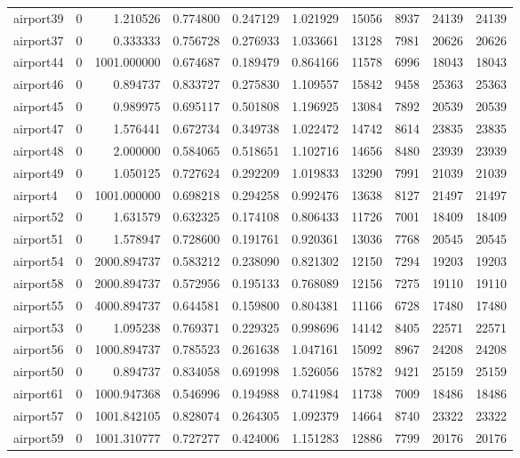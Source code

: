 \begin{longtable}{|l|r|r|r|r|r|r|r|r|r|}
airport39 & 0 & 1.210526 & 0.774800 & 0.247129 & 1.021929 & 15056 & 8937 & 24139 & 24139 \\
airport37 & 0 & 0.333333 & 0.756728 & 0.276933 & 1.033661 & 13128 & 7981 & 20626 & 20626 \\
airport44 & 0 & 1001.000000 & 0.674687 & 0.189479 & 0.864166 & 11578 & 6996 & 18043 & 18043 \\
airport46 & 0 & 0.894737 & 0.833727 & 0.275830 & 1.109557 & 15842 & 9458 & 25363 & 25363 \\
airport45 & 0 & 0.989975 & 0.695117 & 0.501808 & 1.196925 & 13084 & 7892 & 20539 & 20539 \\
airport47 & 0 & 1.576441 & 0.672734 & 0.349738 & 1.022472 & 14742 & 8614 & 23835 & 23835 \\
airport48 & 0 & 2.000000 & 0.584065 & 0.518651 & 1.102716 & 14656 & 8480 & 23939 & 23939 \\
airport49 & 0 & 1.050125 & 0.727624 & 0.292209 & 1.019833 & 13290 & 7991 & 21039 & 21039 \\
airport4 & 0 & 1001.000000 & 0.698218 & 0.294258 & 0.992476 & 13638 & 8127 & 21497 & 21497 \\
airport52 & 0 & 1.631579 & 0.632325 & 0.174108 & 0.806433 & 11726 & 7001 & 18409 & 18409 \\
airport51 & 0 & 1.578947 & 0.728600 & 0.191761 & 0.920361 & 13036 & 7768 & 20545 & 20545 \\
airport54 & 0 & 2000.894737 & 0.583212 & 0.238090 & 0.821302 & 12150 & 7294 & 19203 & 19203 \\
airport58 & 0 & 2000.894737 & 0.572956 & 0.195133 & 0.768089 & 12156 & 7275 & 19110 & 19110 \\
airport55 & 0 & 4000.894737 & 0.644581 & 0.159800 & 0.804381 & 11166 & 6728 & 17480 & 17480 \\
airport53 & 0 & 1.095238 & 0.769371 & 0.229325 & 0.998696 & 14142 & 8405 & 22571 & 22571 \\
airport56 & 0 & 1000.894737 & 0.785523 & 0.261638 & 1.047161 & 15092 & 8967 & 24208 & 24208 \\
airport50 & 0 & 0.894737 & 0.834058 & 0.691998 & 1.526056 & 15782 & 9421 & 25159 & 25159 \\
airport61 & 0 & 1000.947368 & 0.546996 & 0.194988 & 0.741984 & 11738 & 7009 & 18486 & 18486 \\
airport57 & 0 & 1001.842105 & 0.828074 & 0.264305 & 1.092379 & 14664 & 8740 & 23322 & 23322 \\
airport59 & 0 & 1001.310777 & 0.727277 & 0.424006 & 1.151283 & 12886 & 7799 & 20176 & 20176 \\

\end{longtable}
